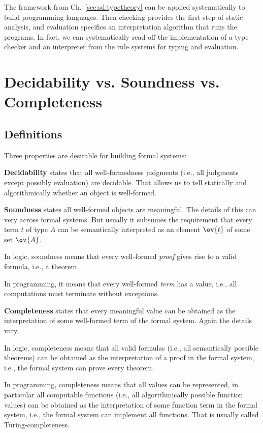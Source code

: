 The framework from Ch.~\ref{sec:sd:typetheory} can be applied systematically to build programming languages.
Then checking provides the first step of static analysis, and evaluation specifies an interpretation algorithm that runs the programs.
In fact, we can systematically read off the implementation of a type checker and an interpreter from the rule systems for typing and evaluation.

\section{Decidability vs. Soundness vs. Completeness}\label{sec:formsys:decsoucomp}

\subsection{Definitions}

Three properties are desirable for building formal systems:

\textbf{Decidability} states that all well-formedness judgments (i.e., all judgments except possibly evaluation) are decidable.
That allows us to tell statically and algorithmically whether an object is well-formed.

\textbf{Soundness} states all well-formed objects are meaningful.
The details of this can very across formal systems.
But usually it subsumes the requirement that every term $t$ of type $A$ can be semantically interpreted as an element $\ov{t}$ of some set $\ov{A}$.
\begin{compactitem}
 \item In logic, soundness means that every well-formed \emph{proof} gives rise to a valid formula, i.e., a theorem.
 \item In programming, it means that every well-formed \emph{term} has a value, i.e., all computations must terminate without exceptions.
\end{compactitem}

\textbf{Completeness} states that every meaningful value can be obtained as the interpretation of some well-formed term of the formal system.
Again the details vary.
\begin{compactitem}
\item In logic, completeness means that all valid formulas (i.e., all semantically possible theorems) can be obtained as the interpretation of a proof in the formal system, i.e., the formal system can prove every theorem.
\item In programming, completeness means that all values can be represented, in particular all computable functions (i.e., all algorithmically possible function values) can be obtained as the interpretation of some function term in the formal system, i.e., the formal system can implement all functions.
That is usually called Turing-completeness.
\end{compactitem}

